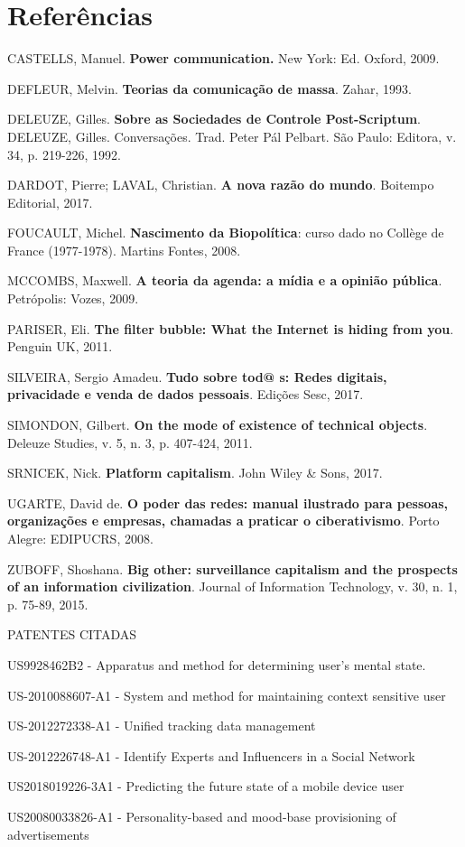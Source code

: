 \section{Referências}

CASTELLS, Manuel. \textbf{Power communication.} New York: Ed. Oxford,
2009.

DEFLEUR, Melvin. \textbf{Teorias da comunicação de massa}. Zahar, 1993.

DELEUZE, Gilles. \textbf{Sobre as Sociedades de Controle Post-Scriptum}.
DELEUZE, Gilles. Conversações. Trad. Peter Pál Pelbart. São Paulo:
Editora, v. 34, p. 219-226, 1992.

DARDOT, Pierre; LAVAL, Christian. \textbf{A nova razão do mundo}.
Boitempo Editorial, 2017.

FOUCAULT, Michel. \textbf{Nascimento da Biopolítica}: curso dado no
Collège de France (1977-1978). Martins Fontes, 2008.

MCCOMBS, Maxwell. \textbf{A teoria da agenda: a mídia e a opinião
pública}. Petrópolis: Vozes, 2009.

PARISER, Eli. \textbf{The filter bubble: What the Internet is hiding
from you}. Penguin UK, 2011.

SILVEIRA, Sergio Amadeu. \textbf{Tudo sobre tod@ s: Redes digitais,
privacidade e venda de dados pessoais}. Edições Sesc, 2017.

SIMONDON, Gilbert. \textbf{On the mode of existence of technical
objects}. Deleuze Studies, v. 5, n. 3, p. 407-424, 2011.

SRNICEK, Nick. \textbf{Platform capitalism}. John Wiley \& Sons, 2017.

UGARTE, David de. \textbf{O poder das redes: manual ilustrado para
pessoas, organizações e empresas, chamadas a praticar o ciberativismo}.
Porto Alegre: EDIPUCRS, 2008.

ZUBOFF, Shoshana. \textbf{Big other: surveillance capitalism and the
prospects of an information civilization}. Journal of Information
Technology, v. 30, n. 1, p. 75-89, 2015.

PATENTES CITADAS

US9928462B2 - Apparatus and method for determining user's mental state.

US-2010088607-A1 - System and method for maintaining context sensitive
user

US-2012272338-A1 - Unified tracking data management

US-2012226748-A1 - Identify Experts and Influencers in a Social Network

US2018019226-3A1 - Predicting the future state of a mobile device user

US20080033826-A1 - Personality-based and mood-base provisioning of
advertisements
